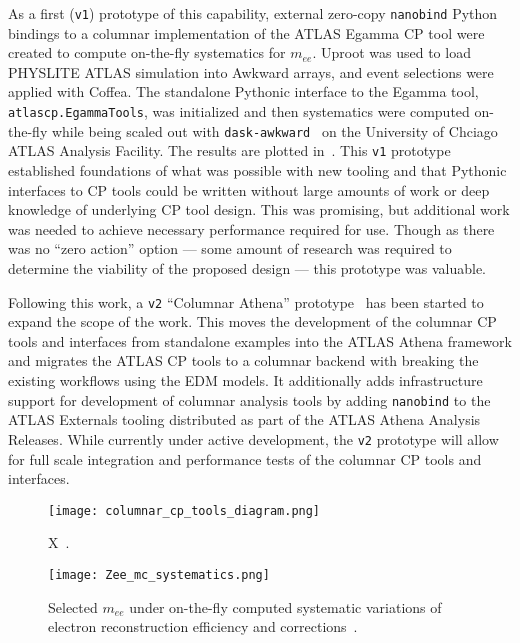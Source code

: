 As a first (\texttt{v1}) prototype of this capability, external zero-copy \texttt{nanobind} Python bindings to a columnar implementation of the ATLAS Egamma CP tool were created to compute on-the-fly systematics for $m_{ee}$.
Uproot was used to load PHYSLITE ATLAS simulation into Awkward arrays, and event selections were applied with Coffea.
The standalone Pythonic interface to the Egamma tool, \texttt{atlascp.EgammaTools}, was initialized and then systematics were computed on-the-fly while being scaled out with \texttt{dask-awkward}~\cite{dask_awkward_2024} on the University of Chciago ATLAS Analysis Facility.
The results are plotted in~.
This \texttt{v1} prototype established foundations of what was possible with new tooling and that Pythonic interfaces to CP tools could be written without large amounts of work or deep knowledge of underlying CP tool design.
This was promising, but additional work was needed to achieve necessary performance required for use.
Though as there was no ``zero action'' option --- some amount of research was required to determine the viability of the proposed design --- this prototype was valuable.

Following this work, a \texttt{v2} ``Columnar Athena'' prototype~\cite{columnar_athena} has been started to expand the scope of the work.
This moves the development of the columnar CP tools and interfaces from standalone examples into the ATLAS Athena framework and migrates the ATLAS CP tools to a columnar backend with breaking the existing workflows using the EDM models.
It additionally adds infrastructure support for development of columnar analysis tools by adding \texttt{nanobind} to the ATLAS Externals tooling distributed as part of the ATLAS Athena Analysis Releases.
While currently under active development, the \texttt{v2} prototype will allow for full scale integration and performance tests of the columnar CP tools and interfaces.

\begin{figure}
    \centering
    \texttt{[image: columnar\_cp\_tools\_diagram.png]}
    \caption{X~\cite{Vigl:ACAT_2024}.}
    \label{fig:columnar_cp_tools_diagram}
\end{figure}

\begin{figure}
    \centering
    \texttt{[image: Zee\_mc\_systematics.png]}
    \caption{Selected $m_{ee}$ under on-the-fly computed systematic variations of electron reconstruction efficiency and corrections~\cite{Vigl:ACAT_2024}.}
    \label{fig:Zee_mc_systematics}
\end{figure}
